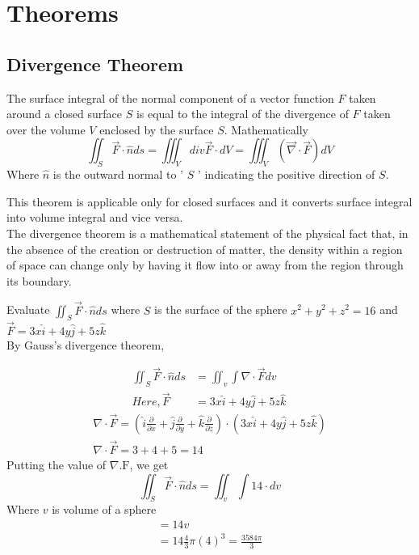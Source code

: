 \section{Theorems}
\subsection{Divergence Theorem}
\begin{definition}
	  The surface integral of the normal component of a vector function $F$ taken around a closed surface $S$ is equal to the integral of the divergence of $F$ taken over the volume $V$ enclosed by the surface $S$. Mathematically
	$$
	\iint_{S} \vec{F} \cdot \hat{n} d s=\iiint_{V} d i v \vec{F}\cdot d V=\iiint_{V}(\vec{\nabla} \cdot \vec{F}) d V
	$$
	Where $\hat{n}$ is the outward normal to ' $S$ ' indicating the positive direction of $S$.
\end{definition}
This theorem is applicable only for closed surfaces and it converts surface integral into volume integral and vice versa.
\\The divergence theorem is a mathematical statement of the physical fact that, in the absence of the creation or destruction of matter, the density within a region of space can change only by having it flow into or away from the region through its boundary.
\begin{exercise}
Evaluate  $\iint_{S} \vec{F} \cdot \hat{n} d s$ where $S$ is the
	surface of the sphere $x^{2}+y^{2}+z^{2}=16$ and $\vec{F}=3 x \hat{i}+4 y \hat{j}+5 z \hat{k}$\\By Gauss's divergence theorem,
\end{exercise}
\begin{answer}
$$\begin{aligned}
	\iint_{S} \vec{F} \cdot \hat{n} d s&=\iint_{v} \int \nabla \cdot \vec{F} d v \quad\\
	Here ,\vec{F}&=3 x \hat{i}+4 y \hat{j}+5 z \hat{k}	
\end{aligned}$$
$$
\begin{array}{l}
	\nabla \cdot \vec{F}=\left(\hat{i} \frac{\partial}{\partial x}+\hat{j} \frac{\partial}{\partial y}+\hat{k} \frac{\partial}{\partial z}\right) \cdot(3 x \hat{i}+4 y \hat{j}+5 z \hat{k}) \\
	\nabla \cdot \vec{F}=3+4+5=14
\end{array}
$$
Putting the value of $\nabla . \mathrm{F}$, we get
$$
\iint_{S} \vec{F} \cdot \hat{n} d s=\iint_{v} \int 14 \cdot d v
$$
Where $v$ is volume of a sphere
$$
\begin{array}{l}
	=14 v \\
	=14 \frac{4}{3} \pi(4)^{3}=\frac{3584 \pi}{3}
\end{array}
$$

\end{answer}	


